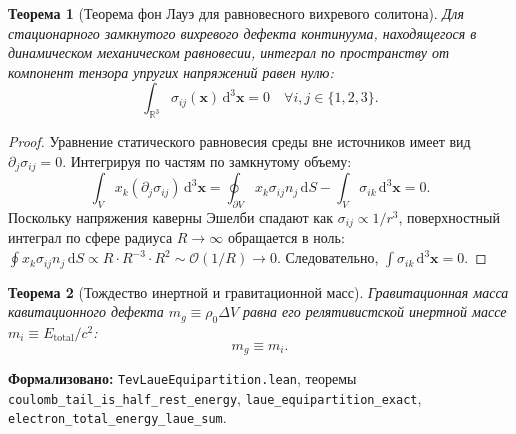 \documentclass[11pt,a4paper]{article}
\newtheorem{theorem}{Теорема}
\theoremstyle{definition}
\theoremstyle{remark}
\begin{document}
\begin{theorem}[Теорема фон Лауэ для равновесного вихревого солитона]
\label{thm:laue_equilibrium}
Для стационарного замкнутого вихревого дефекта континуума, находящегося в динамическом механическом равновесии, интеграл по пространству от компонент тензора упругих напряжений равен нулю:
\begin{equation}
	\int_{\mathbb{R}^3} \sigma_{ij}(\mathbf{x}) \, \mathrm{d}^3\mathbf{x} = 0 \quad \forall i, j \in \{1, 2, 3\}.
	\label{eq:laue_equilibrium_zero}
\end{equation}
\end{theorem}

\begin{proof}
Уравнение статического равновесия среды вне источников имеет вид $\partial_j \sigma_{ij} = 0$. Интегрируя по частям по замкнутому объему:
\begin{equation}
	\int_V x_k (\partial_j \sigma_{ij}) \, \mathrm{d}^3\mathbf{x} = \oint_{\partial V} x_k \sigma_{ij} n_j \, \mathrm{d}S - \int_V \sigma_{ik} \, \mathrm{d}^3\mathbf{x} = 0.
\end{equation}
Поскольку напряжения каверны Эшелби спадают как $\sigma_{ij} \propto 1/r^3$, поверхностный интеграл по сфере радиуса $R \to \infty$ обращается в ноль: $\oint x_k \sigma_{ij} n_j \, \mathrm{d}S \propto R \cdot R^{-3} \cdot R^2 \sim \mathcal{O}(1/R) \to 0$. Следовательно, $\int \sigma_{ik} \, \mathrm{d}^3\mathbf{x} = 0$.
\end{proof}

\begin{theorem}[Тождество инертной и гравитационной масс]
\label{thm:equivalence_principle_exact}
Гравитационная масса кавитационного дефекта $m_g \equiv \rho_0 \Delta V$ равна его релятивистской инертной массе $m_i \equiv E_{\mathrm{total}} / c^2$:
\begin{equation}
	m_g \equiv m_i.
	\label{eq:equivalence_principle_identity}
\end{equation}
\end{theorem}

\noindent\small\textbf{Формализовано:} \texttt{TevLaueEquipartition.lean}, теоремы \texttt{coulomb\_tail\_is\_half\_rest\_energy}, \texttt{laue\_equipartition\_exact}, \texttt{electron\_total\_energy\_laue\_sum}.
\end{document}

